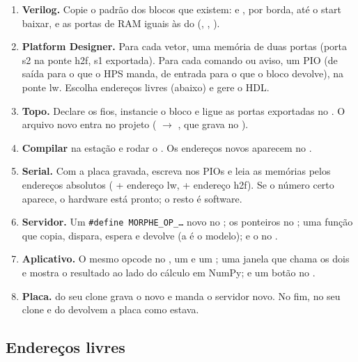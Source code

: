\documentclass[11pt,a4paper,oneside]{article}
\begin{document}
\begin{enumerate}
  \item \textbf{Verilog.} Copie o padrão dos blocos que existem:  e
    ,  por borda,  até o start baixar, e as
    portas de RAM iguais às do  (,
    , ).
  \item \textbf{Platform Designer.} Para cada vetor, uma memória de duas
    portas (porta s2 na ponte h2f, s1 exportada). Para cada comando ou aviso,
    um PIO (de saída para o que o HPS manda, de entrada para o que o bloco
    devolve), na ponte lw. Escolha endereços livres (abaixo) e gere o HDL.
  \item \textbf{Topo.} Declare os fios, instancie o bloco e ligue as portas
    exportadas no . O arquivo  novo entra no
    projeto ( \(\to\) , que grava no
    ).
  \item \textbf{Compilar} na estação e rodar o . Os
    endereços novos aparecem no .
  \item \textbf{Serial.} Com a placa gravada, escreva nos PIOs e leia as
    memórias pelos endereços absolutos ( + endereço lw,
     + endereço h2f). Se o número certo aparece, o hardware
    está pronto; o resto é software.
  \item \textbf{Servidor.} Um \texttt{\#define MORPHE\_OP\_\ldots} novo no
    ; os ponteiros no ; uma função
     que copia, dispara, espera e devolve (a  é
    o modelo); e o  no .
  \item \textbf{Aplicativo.} O mesmo opcode no , um
     e um ; uma janela que chama
    os dois e mostra o resultado ao lado do cálculo em NumPy; e um botão no
    .
  \item \textbf{Placa.}   do seu clone grava o
     novo e manda o servidor novo. No fim,  no seu clone e
     do  devolvem a placa como estava.
\end{enumerate}

\subsection*{Endereços livres}
\end{document}

